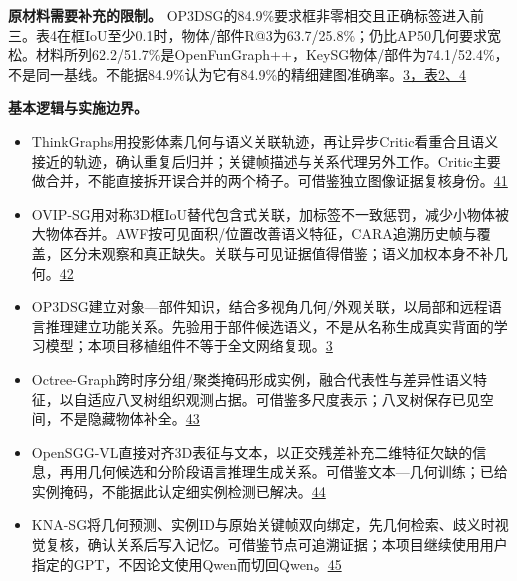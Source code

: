 \documentclass[UTF8,fontset=fandol]{ctexart}
\begin{document}
\textbf{原材料需要补充的限制。} OP3DSG的84.9\%要求框非零相交且正确标签进入前三。表4在框IoU至少0.1时，物体/部件R@3为63.7/25.8\%；仍比AP50几何要求宽松。材料所列62.2/51.7\%是OpenFunGraph++，KeySG物体/部件为74.1/52.4\%，不是同一基线。不能据84.9\%认为它有84.9\%的精细建图准确率。\href{https://arxiv.org/html/2606.29786v1}{3，表2、4}



\textbf{基本逻辑与实施边界。}



\begin{itemize}
\item ThinkGraphs用投影体素几何与语义关联轨迹，再让异步Critic看重合且语义接近的轨迹，确认重复后归并；关键帧描述与关系代理另外工作。Critic主要做合并，不能直接拆开误合并的两个椅子。可借鉴独立图像证据复核身份。\href{https://arxiv.org/html/2606.31471v1}{41}


\item OVIP-SG用对称3D框IoU替代包含式关联，加标签不一致惩罚，减少小物体被大物体吞并。AWF按可见面积/位置改善语义特征，CARA追溯历史帧与覆盖，区分未观察和真正缺失。关联与可见证据值得借鉴；语义加权本身不补几何。\href{https://arxiv.org/html/2608.17633v5}{42}


\item OP3DSG建立对象—部件知识，结合多视角几何/外观关联，以局部和远程语言推理建立功能关系。先验用于部件候选语义，不是从名称生成真实背面的学习模型；本项目移植组件不等于全文网络复现。\href{https://arxiv.org/html/2606.29786v1}{3}


\item Octree-Graph跨时序分组/聚类掩码形成实例，融合代表性与差异性语义特征，以自适应八叉树组织观测占据。可借鉴多尺度表示；八叉树保存已见空间，不是隐藏物体补全。\href{https://openaccess.thecvf.com/content/ICCV2025/papers/Wang\_Open-Vocabulary\_Octree-Graph\_for\_3D\_Scene\_Understanding\_ICCV\_2025\_paper.pdf}{43}


\item OpenSGG-VL直接对齐3D表征与文本，以正交残差补充二维特征欠缺的信息，再用几何候选和分阶段语言推理生成关系。可借鉴文本—几何训练；已给实例掩码，不能据此认定细实例检测已解决。\href{https://doi.org/10.1145/3805622.3810857}{44}


\item KNA-SG将几何预测、实例ID与原始关键帧双向绑定，先几何检索、歧义时视觉复核，确认关系后写入记忆。可借鉴节点可追溯证据；本项目继续使用用户指定的GPT，不因论文使用Qwen而切回Qwen。\href{https://www.mdpi.com/2227-7080/14/7/425}{45}

\end{itemize}
\end{document}
